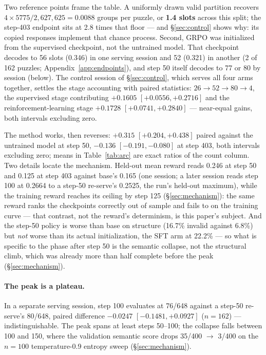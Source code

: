 \documentclass{article}
\begin{document}
Two reference points frame the table. A uniformly drawn valid partition
recovers $4 \times 5775/2{,}627{,}625 = 0.0088$ groups per puzzle, or
\textbf{1.4 slots} across this split; the step-403 endpoint sits at 2.8
times that floor --- and \S\ref{sec:control} shows why: its copied
responses implement that chance process. Second, GRPO was initialized from the supervised checkpoint,
not the untrained model. That checkpoint decodes to 56 slots (0.346)
in one serving session and 52 (0.321) in another (2 of 162 puzzles;
Appendix~\ref{app:endpoints}), and step 50 itself decodes to 77 or 80 by
session (below). The control session of \S\ref{sec:control}, which serves
all four arms together, settles the stage accounting with paired
statistics: $26 \rightarrow 52 \rightarrow 80 \rightarrow 4$, the
supervised stage contributing $+0.1605$ $[+0.0556, +0.2716]$ and the
reinforcement-learning stage $+0.1728$ $[+0.0741, +0.2840]$ --- near-equal
gains, both intervals excluding zero.

The method works, then reverses: $+0.315$ $[+0.204, +0.438]$ paired against
the untrained model at step 50, $-0.136$ $[-0.191, -0.080]$ at step 403, both
intervals excluding zero; means in Table~\ref{tab:arc} are exact ratios of
the count column. Two details locate the
mechanism. Held-out mean reward reads 0.246 at step 50 and 0.125 at step
403 against base's 0.165 (one session; a later session reads step 100 at
0.2664 to a step-50 re-serve's 0.2525, the run's held-out maximum),
while the training reward reaches its ceiling by step 125
(\S\ref{sec:mechanism}): the same reward ranks the checkpoints correctly
out of sample and fails to on the training curve --- that contrast, not
the reward's determinism, is this paper's subject. And
the step-50 policy is worse than base on structure (16.7\% invalid against
6.8\%) but \emph{not} worse than its actual initialization, the SFT arm at
22.2\% --- so what is specific to the phase after step 50 is the semantic
collapse, not the structural climb, which was already more than half
complete before the peak (\S\ref{sec:mechanism}).

\paragraph{The peak is a plateau.} In a separate serving session, step 100
evaluates at 76/648 against a step-50 re-serve's 80/648, paired difference
$-0.0247$ $[-0.1481, +0.0927]$ ($n=162$) --- indistinguishable. The peak spans at least steps 50--100; the collapse
falls between 100 and 150, where the validation semantic score drops
35/400 $\to$ 3/400 on the $n=100$ temperature-0.9 entropy sweep
(\S\ref{sec:mechanism}).
\end{document}
